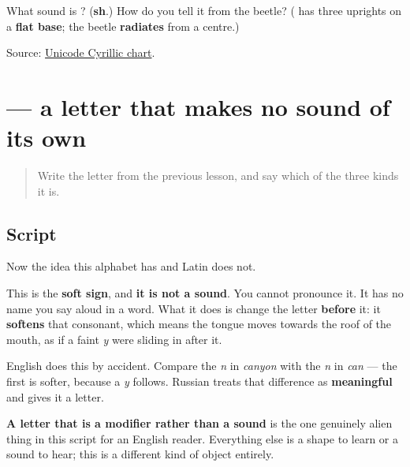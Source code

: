 \begin{tcolorbox}[breakable,colback=teal!4,colframe=teal!35!black,title={Before you move on}]
What sound is \textbf{}? (\textbf{sh}.) How do you tell it from the beetle? (\textbf{} has three uprights on a \textbf{flat base}; the beetle \textbf{radiates} from a centre.)

Source: \href{https://www.unicode.org/charts/PDF/U0400.pdf}{Unicode Cyrillic chart}.
\end{tcolorbox}
\section[\texorpdfstring{\ru{ь} ((soft sign))}{ь ((soft sign))}]{ — a letter that makes no sound of its own}

\label{lesson:RU-W06-soft-sign}



\begin{quote}
Write the letter from the previous lesson, and say which of the three kinds it is.
\end{quote}

\subsection*{Script}

Now the idea this alphabet has and Latin does not.

\begin{quote}
\end{quote}

This is the \textbf{soft sign}, and \textbf{it is not a sound}. You cannot pronounce it. It has no name you say aloud in a word. What it does is change the letter \textbf{before} it: it \textbf{softens} that consonant, which means the tongue moves towards the roof of the mouth, as if a faint \emph{y} were sliding in after it.

English does this by accident. Compare the \emph{n} in \emph{canyon} with the \emph{n} in \emph{can} — the first is softer, because a \emph{y} follows. Russian treats that difference as \textbf{meaningful} and gives it a letter.

\textbf{A letter that is a modifier rather than a sound} is the one genuinely alien thing in this script for an English reader. Everything else is a shape to learn or a sound to hear; this is a different kind of object entirely.

